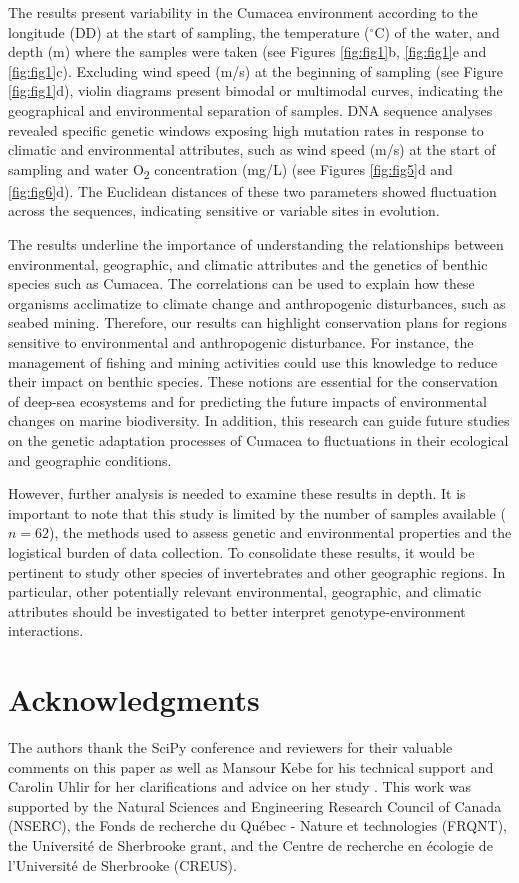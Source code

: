 The results present variability in the Cumacea environment according to the longitude (DD) at the start of sampling, the temperature ($^\circ$C) of the water, and depth (m) where the samples were taken (see Figures \ref{fig:fig1}b, \ref{fig:fig1}e and \ref{fig:fig1}c). Excluding wind speed (m/s) at the beginning of sampling (see Figure \ref{fig:fig1}d), violin diagrams present bimodal or multimodal curves, indicating the geographical and environmental separation of samples. DNA sequence analyses revealed specific genetic windows exposing high mutation rates in response to climatic and environmental attributes, such as wind speed (m/s) at the start of sampling and water O\textsubscript{2} concentration (mg/L) (see Figures \ref{fig:fig5}d and \ref{fig:fig6}d). The Euclidean distances of these two parameters showed fluctuation across the sequences, indicating sensitive or variable sites in evolution.

The results underline the importance of understanding the relationships between environmental, geographic, and climatic attributes and the genetics of benthic species such as Cumacea. The correlations can be used to explain how these organisms acclimatize to climate change and anthropogenic disturbances, such as seabed mining. Therefore, our results can highlight conservation plans for regions sensitive to environmental and anthropogenic disturbance. For instance, the management of fishing and mining activities could use this knowledge to reduce their impact on benthic species. These notions are essential for the conservation of deep-sea ecosystems and for predicting the future impacts of environmental changes on marine biodiversity. In addition, this research can guide future studies on the genetic adaptation processes of Cumacea to fluctuations in their ecological and geographic conditions.

However, further analysis is needed to examine these results in depth. It is important to note that this study is limited by the number of samples available ($n=62$), the methods used to assess genetic and environmental properties and the logistical burden of data collection. To consolidate these results, it would be pertinent to study other species of invertebrates and other geographic regions. In particular, other potentially relevant environmental, geographic, and climatic attributes should be investigated to better interpret genotype-environment interactions.


\section{Acknowledgments}\label{acknowledgments}

The authors thank the SciPy conference and reviewers for their valuable comments on this paper as well as Mansour Kebe for his technical support and Carolin Uhlir for her clarifications and advice on her study \citep{uhlir_adding_2021}. This work was supported by the Natural Sciences and Engineering Research Council of Canada (NSERC), the Fonds de recherche du Québec - Nature et technologies (FRQNT), the Université de Sherbrooke grant, and the Centre de recherche en écologie de l’Université de Sherbrooke (CREUS).
